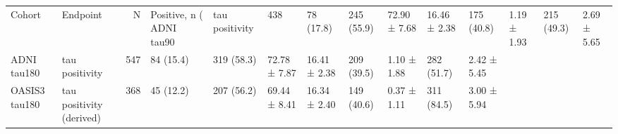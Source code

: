 \begin{tabular}{llrllllllll}
\toprule
Cohort & Endpoint & N & Positive, n (%
\midrule
ADNI tau90 & tau positivity & 438 & 78 (17.8) & 245 (55.9) & 72.90 ± 7.68 & 16.46 ± 2.38 & 175 (40.8) & 1.19 ± 1.93 & 215 (49.3) & 2.69 ± 5.65 \\
ADNI tau180 & tau positivity & 547 & 84 (15.4) & 319 (58.3) & 72.78 ± 7.87 & 16.41 ± 2.38 & 209 (39.5) & 1.10 ± 1.88 & 282 (51.7) & 2.42 ± 5.45 \\
OASIS3 tau180 & tau positivity (derived) & 368 & 45 (12.2) & 207 (56.2) & 69.44 ± 8.41 & 16.34 ± 2.40 & 149 (40.6) & 0.37 ± 1.11 & 311 (84.5) & 3.00 ± 5.94 \\
\bottomrule
\end{tabular}

